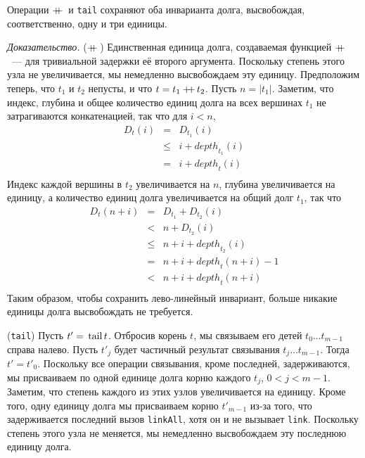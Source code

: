 \begin{theorem}\label{th:10.1}
  Операции $+\!\!\!+\,$ и \lstinline!tail! сохраняют оба инварианта
  долга, высвобождая, соответственно, одну и три единицы.

  \emph{Доказательство.} ($+\!\!\!+\,$) Единственная единица долга,
  создаваемая функцией $+\!\!\!+\,$~--- для тривиальной задержки её второго
  аргумента. Поскольку степень этого узла не увеличивается, мы
  немедленно высвобождаем эту единицу.  Предположим теперь, что $t_1$
  и $t_2$ непусты, и что $t = t_1 +\!\!\!+\, t_2$. Пусть $n =
  |t_1|$. Заметим, что индекс, глубина и общее количество единиц долга
  на всех вершинах $t_1$ не затрагиваются конкатенацией, так что для
  $i < n$,
  $$
  \begin{array}{lcl}
    D_t(i) & = & D_{t_1}(i) \\
           & \le & i + \mathit{depth}_{t_1}(i) \\
           & = & i + \mathit{depth}_t(i) \\
  \end{array}
  $$
  Индекс каждой вершины в $t_2$ увеличивается на $n$, глубина
  увеличивается на единицу, а количество единиц долга увеличивается на
  общий долг $t_1$, так что
  $$
  \begin{array}{lcl}
    D_t(n+i) & = & D_{t_1} + D_{t_2}(i) \\
             & < & n + D_{t_2}(i) \\
             & \le & n + i + \mathit{depth}_{t_2}(i) \\
             & = & n + i + \mathit{depth}_t(n+i) - 1 \\
             & < & n + i + \mathit{depth}_t(n+i) \\
  \end{array}
  $$
  Таким образом, чтобы сохранить лево-линейный инвариант, больше
  никакие единицы долга высвобождать не требуется.

  (\lstinline!tail!) Пусть $t' = \lstinline!tail! t$. Отбросив корень
  $t$, мы связываем его детей $t_0 \ldots t_{m-1}$ справа
  налево. Пусть $t'_j$ будет частичный результат связывания $t_j
  \ldots t_{m-1}$. Тогда $t' = t'_0$.  Поскольку все операции
  связывания, кроме последней, задерживаются, мы присваиваем по одной
  единице долга корню каждого $t_j$, $0 < j < m-1$. Заметим, что
  степень каждого из этих узлов увеличивается на единицу.  Кроме того,
  одну единицу долга мы присваиваем корню $t'_{m-1}$ из-за того, что
  задерживается последний вызов \lstinline!linkAll!, хотя он и не
  вызывает \lstinline!link!.  Поскольку степень этого узла не
  меняется, мы немедленно высвобождаем эту последнюю единицу долга.


\end{theorem}
